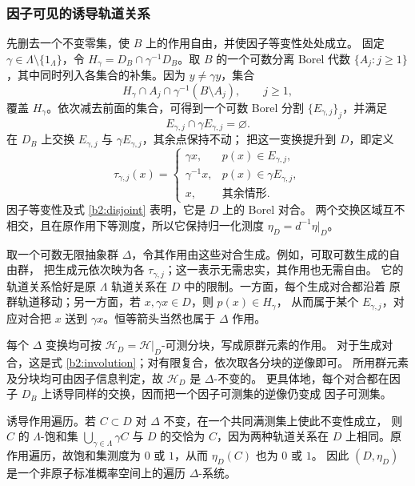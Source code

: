\documentclass[UTF8,zihao=-4,a4paper]{ctexart}
\numberwithin{equation}{section}
\begin{document}
\subsubsection{因子可见的诱导轨道关系}\label{b2:induction}

先删去一个不变零集，使 $B$ 上的作用自由，并使因子等变性处处成立。
固定 $\gamma\in\Lambda\setminus\{1_\Lambda\}$，令
$H_\gamma=D_B\cap\gamma^{-1}D_B$。取 $B$ 的一个可数分离 Borel 代数
$\{A_j:j\ge1\}$，其中同时列入各集合的补集。因为 $y\ne\gamma y$，集合
\[
 H_\gamma\cap A_j\cap\gamma^{-1}(B\setminus A_j),\qquad j\ge1,
\]
覆盖 $H_\gamma$。依次减去前面的集合，可得到一个可数 Borel 分割
$\{E_{\gamma,j}\}_j$，并满足
\begin{equation}\label{b2:disjoint}
 E_{\gamma,j}\cap\gamma E_{\gamma,j}=\varnothing.
\end{equation}
在 $D_B$ 上交换 $E_{\gamma,j}$ 与 $\gamma E_{\gamma,j}$，其余点保持不动；
把这一变换提升到 $D$，即定义
\begin{equation}\label{b2:involution}
 \tau_{\gamma,j}(x)=
 \begin{cases}
 \gamma x,&p(x)\in E_{\gamma,j},\\
 \gamma^{-1}x,&p(x)\in\gamma E_{\gamma,j},\\
 x,&\text{其余情形}.
 \end{cases}
\end{equation}
因子等变性及式 \eqref{b2:disjoint} 表明，它是 $D$ 上的 Borel 对合。
两个交换区域互不相交，且在原作用下等测度，所以它保持归一化测度
$\eta_D=d^{-1}\eta|_D$。

取一个可数无限抽象群 $\Delta$，令其作用由这些对合生成。例如，可取可数生成的自由群，
把生成元依次映为各 $\tau_{\gamma,j}$；这一表示无需忠实，其作用也无需自由。
它的轨道关系恰好是原 $\Lambda$ 轨道关系在 $D$ 中的限制。一方面，每个生成对合都沿着
原群轨道移动；另一方面，若 $x,\gamma x\in D$，则 $p(x)\in H_\gamma$，
从而属于某个 $E_{\gamma,j}$，对应对合把 $x$ 送到 $\gamma x$。恒等箭头当然也属于
$\Delta$ 作用。

每个 $\Delta$ 变换均可按 $\mathcal H_D=\mathcal H|_D$-可测分块，写成原群元素的作用。
对于生成对合，这是式 \eqref{b2:involution}；对有限复合，依次取各分块的逆像即可。
所用群元素及分块均可由因子信息判定，故 $\mathcal H_D$ 是 $\Delta$-不变的。
更具体地，每个对合都在因子 $D_B$ 上诱导同样的交换，因而把一个因子可测集的逆像仍变成
因子可测集。

诱导作用遍历。若 $C\subset D$ 对 $\Delta$ 不变，在一个共同满测集上使此不变性成立，
则 $C$ 的 $\Lambda$-饱和集
$\bigcup_{\gamma\in\Lambda}\gamma C$ 与 $D$ 的交恰为 $C$，因为两种轨道关系在 $D$
上相同。原作用遍历，故饱和集测度为 $0$ 或 $1$，从而 $\eta_D(C)$ 也为 $0$ 或 $1$。
因此 $(D,\eta_D)$ 是一个非原子标准概率空间上的遍历 $\Delta$-系统。
\end{document}
